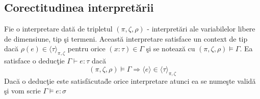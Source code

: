 \subsection{Corectitudinea interpret\u arii}
\begin{definition}
Fie o interpretare dat\u a de tripletul $(\pi,\zeta, \rho)$ - interpret\u ari ale variabilelor libere de dimensiune, tip \c si termeni. Aceast\u a interpretare satisface un context de tip dac\u a $\rho(e) \in \langle \tau \rangle_{\pi,\zeta}$ pentru orice $(x:\tau) \in \Gamma$ \c si se noteaz\u a cu $(\pi,\zeta, \rho) \models \Gamma$. Ea satisface o deduc\c tie $\Gamma \vdash e : \tau$ dac\u a
    $$(\pi,\zeta, \rho) \models \Gamma \Rightarrow \langle e \rangle \in \langle \tau \rangle_{\pi,\zeta}$$
Dac\u a o deduc\c tie este satisf\u acuta\u  de orice interpretare atunci ea se nume\c ste valid\u a \c si vom scrie $\Gamma \models e : \sigma$
\end{definition}

